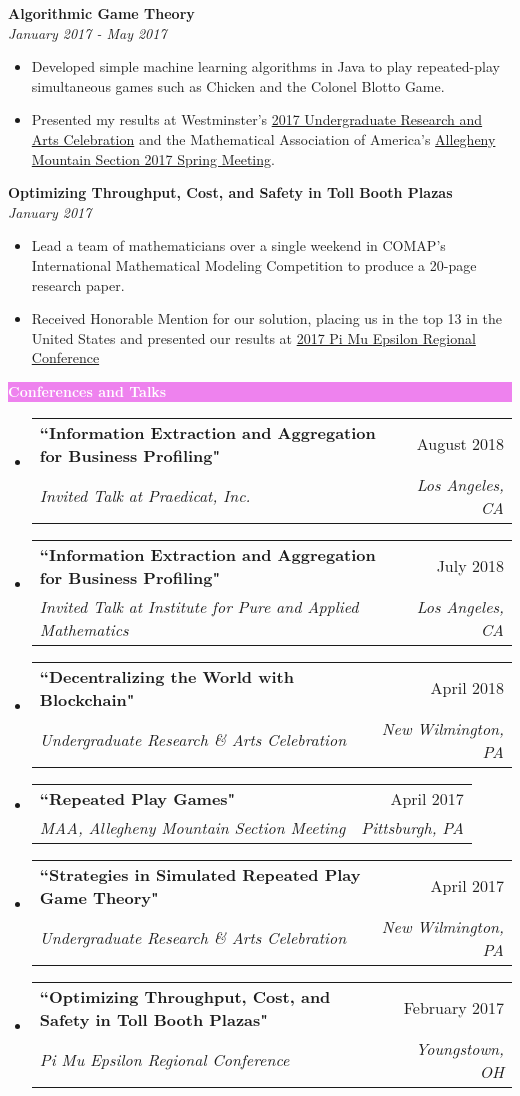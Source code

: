 \documentclass[letterpaper,11pt]{article}
\makeatletter
\newcommand{\resitem}[1]{\item #1 \vspace{-2pt}}
\newcommand{\resheading}[1]{{\large \colorbox{violet}{\begin{minipage}{\textwidth}{\textbf{#1 \vphantom{p\^{E}}}}\end{minipage}}}}
\newcommand{\ressubheading}[4]{
	\begin{tabular*}{7.0in}{l@{\extracolsep{\fill}}r}
		\textbf{#1} & #2 \\
		\textit{#3} & \textit{#4} \\
	\end{tabular*}\vspace{-6pt}}
\makeatother
\begin{document}
		\textbf{Algorithmic Game Theory} \\ \textit{January 2017 - May 2017}
		\begin{itemize}[topsep=3pt, itemsep=1pt]
			\resitem{Developed simple machine learning algorithms in Java to play repeated-play simultaneous games such as Chicken and the Colonel Blotto Game.}
			\resitem{Presented my results at Westminster's \href{https://alexandermichels.github.io/docs/2017-urac-schedule.pdf}{2017 Undergraduate Research and Arts Celebration} and the Mathematical Association of America's \href{https://alexandermichels.github.io/docs/MAA2017Abstracts.pdf}{Allegheny Mountain Section 2017 Spring Meeting}.}
		\end{itemize}
	
		\textbf{Optimizing Throughput, Cost, and Safety in Toll Booth Plazas} \\ \textit{January 2017}
		\begin{itemize}[topsep=3pt, itemsep=1pt]
			\resitem{Lead a team of mathematicians over a single weekend in COMAP's International Mathematical Modeling Competition to produce a 20-page research paper.}
			\resitem{Received Honorable Mention for our solution, placing us in the top 13 in the United States and presented our results at \href{https://alexandermichels.github.io/docs/PME2017Program.pdf}{2017 Pi Mu Epsilon Regional Conference}}
		\end{itemize}
	
	
		\resheading{\textcolor{white}{Conferences and Talks}}
	
		\begin{itemize}[topsep=3pt, itemsep=1pt]
			\item
			\ressubheading{``Information Extraction and Aggregation for Business Profiling"}{August 2018}{Invited Talk at Praedicat, Inc.}{Los Angeles, CA}
			\item
			\ressubheading{``Information Extraction and Aggregation for Business Profiling"}{July 2018}{Invited Talk at Institute for Pure and Applied Mathematics}{Los Angeles, CA}
			\item
			\ressubheading{``Decentralizing the World with Blockchain"}{April 2018}{Undergraduate Research \& Arts Celebration}{New Wilmington, PA}
			\item
			\ressubheading{``Repeated Play Games"}{April 2017}{MAA, Allegheny Mountain Section Meeting}{Pittsburgh, PA}
			\item
			\ressubheading{``Strategies in Simulated Repeated Play Game Theory"}{April 2017}{Undergraduate Research \& Arts Celebration}{New Wilmington, PA}
			\item
			\ressubheading{``Optimizing Throughput, Cost, and Safety in Toll Booth Plazas"}{February 2017}{Pi Mu Epsilon Regional Conference}{Youngstown, OH}
			
		\end{itemize}
	
\end{document}
